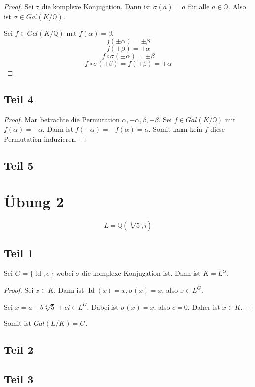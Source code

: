 \documentclass[10pt,a4paper]{article}
\DeclareMathOperator{\id}{Id}
\begin{document}
\begin{proof}
  Sei $\sigma$ die komplexe Konjugation.
  Dann ist $\sigma(a) = a$ für alle $a \in \mathbb{Q}$.
  Also ist $\sigma \in Gal(K / \mathbb{Q})$.

  Sei $f \in Gal(K / \mathbb{Q})$ mit $f(\alpha) = \beta$.
  \begin{equation}
    f(\pm \alpha) = \pm \beta
  \end{equation}
  \begin{equation}
    f(\pm \beta) = \pm \alpha
  \end{equation}
  \begin{equation}
    f \circ \sigma(\pm \alpha) = \pm \beta
  \end{equation}
  \begin{equation}
    f \circ \sigma(\pm \beta) = f(\mp \beta) = \mp \alpha
  \end{equation}
\end{proof}

\subsection{Teil 4}

\begin{proof}
  Man betrachte die Permutation $\alpha, -\alpha, \beta, -\beta$.
  Sei $f \in Gal(K / \mathbb{Q})$ mit $f(\alpha) = -\alpha$.
  Dann ist $f(-\alpha) = -f(\alpha) = \alpha$.
  Somit kann kein $f$ diese Permutation induzieren.
\end{proof}

\subsection{Teil 5}

\section{Übung 2}

\begin{equation}
  L = \mathbb{Q}(\sqrt[4]{5}, i)
\end{equation}

\subsection{Teil 1}

Sei $G = \{ \id, \sigma \}$ wobei $\sigma$ die komplexe Konjugation ist.
Dann ist $K = L^{G}$.

\begin{proof}
  Sei $x \in K$.
  Dann ist $\id(x) = x, \sigma(x) = x$, also $x \in L^{G}$.

  Sei $x = a + b\sqrt[4]{5} + ci \in L^{G}$.
  Dabei ist $\sigma(x) = x$, also $c = 0$.
  Daher ist $x \in K$.
\end{proof}

Somit ist $Gal(L / K) = G$.

\subsection{Teil 2}

\subsection{Teil 3}
\end{document}

